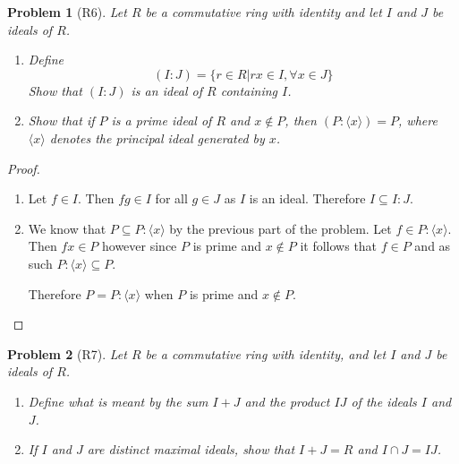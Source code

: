 \documentclass[10pt]{article}
\newcommand{\sk}{\vskip 10mm}
\theoremstyle{plain}
\newtheorem{problem}{Problem}
\theoremstyle{remark}
\begin{document}
\sk


\begin{problem}[R6]
  Let $R$ be a commutative ring with identity and let $I$ and $J$
  be ideals of $R$.
  \begin{enumerate}
  \item Define
    \[ (I:J)=\{r\in R|rx\in I, \forall x\in J\} \]
    Show that $(I:J)$ is an ideal of $R$ containing $I$.
  \item Show that if $P$ is a prime ideal of $R$ and $x\notin P$,
    then $(P:\langle x\rangle)=P$, where $\langle x\rangle$ denotes the
    principal ideal generated by $x$.
  \end{enumerate}
\end{problem}

\begin{proof}
  \begin{enumerate}
  \item Let $f\in I$. Then $fg\in I$ for all $g\in J$ as $I$ is an ideal. Therefore
    $I\subseteq I:J$.
  \item We know that $P\subseteq P:\langle x\rangle$ by the previous part of the problem. Let
    $f\in P:\langle x\rangle$. Then $fx\in P$ however since $P$ is prime and $x\notin P$ it follows
    that $f\in P$ and as such $P:\langle x\rangle\subseteq P$.

    Therefore $P=P:\langle x\rangle$ when $P$ is prime and $x\notin P$.
  \end{enumerate}
\end{proof}

\sk


\begin{problem}[R7]
  Let $R$ be a commutative ring with identity, and let $I$ and $J$ be ideals
  of $R$.
  \begin{enumerate}
  \item Define what is meant by the sum $I+J$ and the product $IJ$ of
    the ideals $I$ and $J$.
  \item If $I$ and $J$ are distinct maximal ideals, show that $I+J=R$ and
    $I\cap J=IJ$.
  \end{enumerate}
\end{problem}
\end{document}
